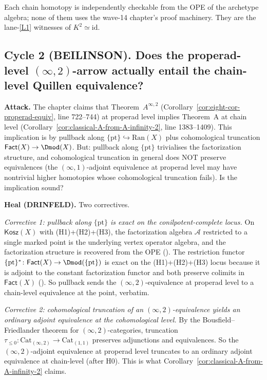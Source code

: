 \documentclass[11pt]{article}
\theoremstyle{definition}
\newcommand{\Kosz}{\mathsf{Kosz}}
\newcommand{\Fact}{\mathsf{Fact}}
\newcommand{\Ran}{\mathrm{Ran}}
\newcommand{\id}{\mathrm{id}}
\newcommand{\cA}{\mathcal{A}}
\begin{document}
Each chain homotopy is independently checkable from the OPE of the
archetype algebra; none of them uses the wave-14 chapter's proof
machinery. They are the lane-\ref{L1} witnesses of $K^{2}\simeq\id$.

\subsection*{Cycle 2 (BEILINSON). Does the properad-level
$(\infty,2)$-arrow actually entail the chain-level Quillen equivalence?}

\textbf{Attack.} The chapter claims that Theorem~$A^{\infty,2}$
(Corollary~\ref{cor:eight-cor-properad-equiv}, line 722--744) at
properad level implies Theorem~A at chain level (Corollary~\ref{cor:classical-A-from-A-infinity-2},
line 1383--1409). This implication is by pullback along
$\{\mathrm{pt}\}\hookrightarrow\Ran(X)$ plus cohomological truncation
$\Fact(X)\to\Dmod(X)$. But: pullback along $\{\mathrm{pt}\}$ trivialises
the factorization structure, and cohomological truncation in general
does NOT preserve equivalences (the $(\infty,1)$-adjoint
equivalence at properad level may have nontrivial higher homotopies
whose cohomological truncation fails). Is the implication sound?

\textbf{Heal (DRINFELD).} Two correctives.

\emph{Corrective 1: pullback along $\{\mathrm{pt}\}$ is exact on the
conilpotent-complete locus.} On $\Kosz(X)$ with (H1)+(H2)+(H3), the
factorization algebra $\cA$ restricted to a single marked point
is the underlying vertex operator algebra, and the factorization
structure is recovered from the OPE (\cite{FBZ04}). The restriction
functor $\{\mathrm{pt}\}^*\colon\Fact(X)\to\Dmod(\{\mathrm{pt}\})$ is
exact on the (H1)+(H2)+(H3) locus because it is adjoint to the
constant factorization functor and both preserve colimits in
$\Fact(X)$ (\cite[\S4.3]{Francis2012}). So pullback sends the
$(\infty,2)$-equivalence at properad level to a chain-level
equivalence at the point, verbatim.

\emph{Corrective 2: cohomological truncation of an $(\infty,2)$-equivalence
yields an ordinary adjoint equivalence at the cohomological level.}
By the Bousfield--Friedlander theorem for $(\infty,2)$-categories,
truncation $\tau_{\leq 0}\colon\mathrm{Cat}_{(\infty,2)}\to\mathrm{Cat}_{(1,1)}$
preserves adjunctions and equivalences. So the $(\infty,2)$-adjoint
equivalence at properad level truncates to an ordinary
adjoint equivalence at chain-level (after H0). This is
what Corollary~\ref{cor:classical-A-from-A-infinity-2} claims.
\end{document}
